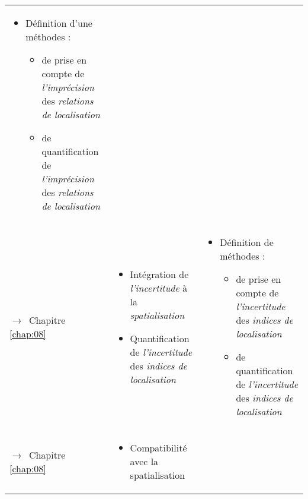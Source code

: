 \begin{tabular}{L{.2\textheight}L{.35\textheight}L{.35\textheight}}
\begin{minipage}[t]{.35\textheight}
    \begin{itemize}
    \item Définition d'une méthodes :
      \begin{itemize}
      \item de prise en compte de \emph{l’imprécision} des
        \emph{relations de localisation}
      \item de quantification de \emph{l'imprécision} des
        \emph{relations de localisation}
      \end{itemize}
    \end{itemize}
  \end{minipage} \\
  \addlinespace[.5cm]
{\par\footnotesize\hspace{.25cm}$\longrightarrow$~Chapitre
\ref{chap:08}} & \begin{minipage}[t]{.35\textheight}
    \begin{itemize}
    \item Intégration de \emph{l'incertitude} à la
      \emph{spatialisation}
    \item Quantification de \emph{l'incertitude} des \emph{indices de
        localisation}
    \end{itemize}
  \end{minipage}& \begin{minipage}[t]{.35\textheight}
    \begin{itemize}
    \item Définition de méthodes :
      \begin{itemize}
      \item de prise en compte de \emph{l’incertitude} des
        \emph{indices de localisation}
      \item de quantification de \emph{l'incertitude} des
        \emph{indices de localisation}
      \end{itemize}
    \end{itemize}
  \end{minipage} \\
  \addlinespace[.5cm]
{\par\footnotesize\hspace{.25cm}$\longrightarrow$~Chapitre
\ref{chap:08}} & \begin{minipage}[t]{.35\textheight}
    \begin{itemize}
    \item Compatibilité avec la spatialisation

\end{itemize}
\end{minipage}
\end{tabular}
